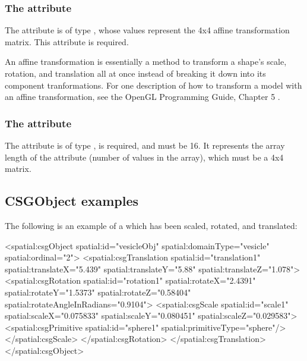 \subsubsection{The \fixttspace{} attribute}
The  attribute is of type , whose values represent the 4x4 affine transformation matrix. This attribute is required.

An affine transformation is essentially a method to transform a shape's scale, rotation, and translation all at once instead of breaking it down into its component tranformations.  For one description of how to transform a model with an affine transformation, see the OpenGL Programming Guide, Chapter 5 \citep{shreiner2013opengl}.


\subsubsection{The \fixttspace{} attribute}
The  attribute is of type , is required, and must be 16. It represents the array length of the  attribute (number of values in the  array), which must be a 4x4 matrix.


\subsection{CSGObject examples}
\label{csgobject-example}
The following is an example of a \CSGObject which has been scaled, rotated, and translated:

\begin{example}
  <spatial:csgObject spatial:id="vesicleObj" spatial:domainType="vesicle"
                     spatial:ordinal="2">
    <spatial:csgTranslation spatial:id="translation1" spatial:translateX="5.439"
                            spatial:translateY="5.88" spatial:translateZ="1.078">
      <spatial:csgRotation  spatial:id="rotation1" spatial:rotateX="2.4391"
                            spatial:rotateY="1.5373" spatial:rotateZ="0.58404"
                            spatial:rotateAngleInRadians="0.9104">
        <spatial:csgScale   spatial:id="scale1" spatial:scaleX="0.075833"
                            spatial:scaleY="0.080451" spatial:scaleZ="0.029583">
          <spatial:csgPrimitive spatial:id="sphere1" spatial:primitiveType="sphere"/>
       </spatial:csgScale>
      </spatial:csgRotation>
    </spatial:csgTranslation>
  </spatial:csgObject>
\end{example}

